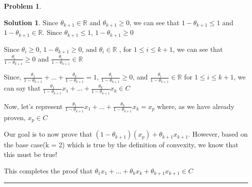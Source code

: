 \documentclass{article}
\theoremstyle{definition}
\newtheorem{problem}{Problem}
\def\fline{\rule{0.75\linewidth}{0.5pt}}
\newcommand{\finishline}{\begin{center}\fline\end{center}}
\newtheorem*{solution*}{Solution}
\newenvironment{solution}{\begin{solution*}}{{\finishline} \end{solution*}}
\begin{document}
\begin{problem}
\begin{solution}
Since $\theta_{k + 1} \in \mathbb{R}$ and $\theta_{k + 1} \geq 0$, we can see that $1 - \theta_{k + 1} \leq 1$ and $1 - \theta_{k + 1} \in \mathbb{R}$. Since $\theta_{k + 1} \leq 1$, $1 - \theta_{k + 1} \geq 0$ \newline 

Since $\theta_{i} \geq 0$, $1 - \theta_{k + 1} \geq 0$, and $\theta_i \in \mathbb{R}$ , for $1 \leq i \leq k + 1$, we can see that $\frac{\theta_i}{1 - \theta_{k + 1}} \geq 0$ and $\frac{\theta_i}{1 - \theta_{k + 1}} \in \mathbb{R}$

Since, $\frac{\theta_1}{1 - \theta_{k + 1}} + ... + \frac{\theta_k}{1 - \theta_{k + 1}} = 1$, $\frac{\theta_i}{1 - \theta_{k + 1}} \geq 0$, and $\frac{\theta_i}{1 - \theta_{k + 1}} \in \mathbb{R}$ for $1 \leq i \leq k + 1$, we can say that $\frac{\theta_1}{1 - \theta_{k + 1}}x_1 + ... + \frac{\theta_k}{1 - \theta_{k + 1}}x_k \in C$ \newline 


Now, let's represent $\frac{\theta_1}{1 - \theta_{k + 1}}x_1 + ... + \frac{\theta_k}{1 - \theta_{k + 1}}x_k = x_p$ where, as we have already proven, $x_p \in C$ \newline 

Our goal is to now prove that $(1 - \theta_{k + 1})(x_p) + \theta_{k + 1}x_{k + 1}$. However, based on the base case(k = 2) which is true by the definition of convexity, we know that this must be true! \newline 


This completes the proof that $\theta_1x_1 + ... + \theta_kx_k + \theta_{k + 1}x_{k + 1} \in C$

\end{solution}
\end{problem}
\end{document}
